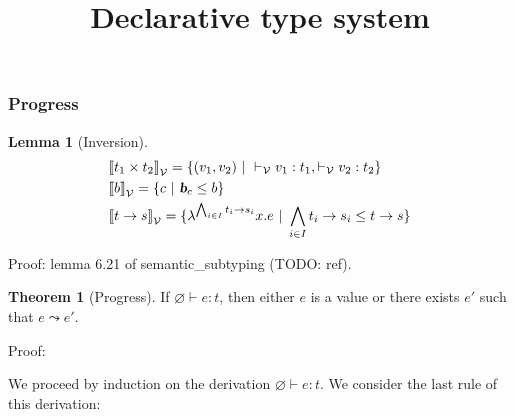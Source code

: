\documentclass[a4paper]{article}
\title{\vspace{1.5cm}Declarative type system}
\author{}
\date{\vspace{-5ex}}
\theoremstyle{definition}
\newtheorem{theorem}{Theorem}
\newtheorem{lemma}{Lemma}
\begin{document}
  \maketitle

  \subsubsection{Progress}

      \begin{lemma}[Inversion]
        \begin{align*}
          &\valsemantic{\pair {t_1} {t_2}} = \{(v_1,v_2) \alt \vvdash v_1:t_1, \vvdash v_2:t_2 \}\\
          &\valsemantic{b} = \{c \alt \basic{c} \leq b \}\\
          &\valsemantic{\arrow t s} = \{\lambda^{\bigwedge_{i\in I}\arrow {t_i} {s_i}}x.e \alt \bigwedge_{i\in I}\arrow {t_i} {s_i} \leq \arrow t s\}
        \end{align*}
      \end{lemma}
      Proof: lemma 6.21 of semantic\_subtyping (TODO: ref).

      \begin{theorem}[Progress]
      If $\varnothing \vdash e:t$, then either $e$ is a value or there exists $e'$ such that $e \leadsto e'$.
      \end{theorem}

      Proof:

      We proceed by induction on the derivation $\varnothing \vdash e:t$.
      We consider the last rule of this derivation:
\end{document}
